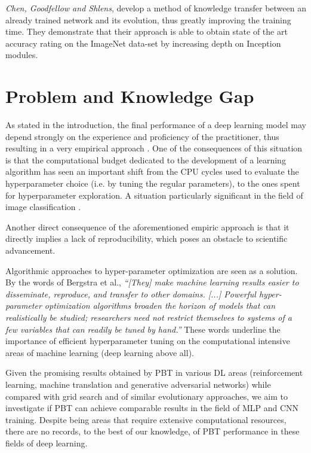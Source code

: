 \documentclass{article}
\begin{document}
\textit{Chen, Goodfellow and Shlens}\cite{Chen2015Net2NetAL}, develop a method of knowledge transfer between an already trained network and its evolution, thus greatly improving the training time. They demonstrate that their approach is able to obtain state of the art accuracy rating on the ImageNet data-set by increasing depth on Inception modules.

\section{Problem and Knowledge Gap}
As stated in the introduction, the final performance of a deep learning model may depend strongly on the experience and proficiency of the practitioner, thus resulting in a very empirical approach \cite{Goodfellow-et-al-2016}\cite{DBLP:series/lncs/7700}.
One of the consequences of this situation is that the computational budget dedicated to the development of a learning algorithm has seen an important shift from the CPU cycles used to evaluate the hyperparameter choice (i.e. by tuning the regular parameters), to the ones spent for hyperparameter exploration. A situation particularly significant in the field of image classification \cite{10.1371/journal.pcbi.1000579}\cite{Coates:2011:IEV:3104482.3104598}.

Another direct consequence of the aforementioned empiric approach is that it directly implies a lack of reproducibility, which poses an obstacle to scientific advancement\cite{Bergstra:2011:AHO:2986459.2986743}.

Algorithmic approaches to hyper-parameter optimization are seen as a solution. By the words of Bergstra et al., \textit{``[They] make machine learning
results easier to disseminate, reproduce, and transfer to other domains. [...] Powerful hyper-parameter optimization algorithms broaden the horizon of
models that can realistically be studied; researchers need not restrict themselves to systems of a few variables that can readily be tuned by hand.''}\cite{Bergstra:2011:AHO:2986459.2986743}
These words underline the importance of efficient hyperparameter tuning on the computational intensive areas of machine learning (deep learning above all). 

Given the promising results obtained by PBT\cite{PBT} in various DL areas (reinforcement learning, machine translation and generative adversarial networks) while compared with grid search and of similar evolutionary approaches\cite{pmlr-v70-real17a}, we aim to investigate if PBT can achieve comparable results in the field of MLP and CNN training. Despite being areas that require extensive computational resources, there are no records, to the best of our knowledge, of PBT performance in these fields of deep learning.
\end{document}
